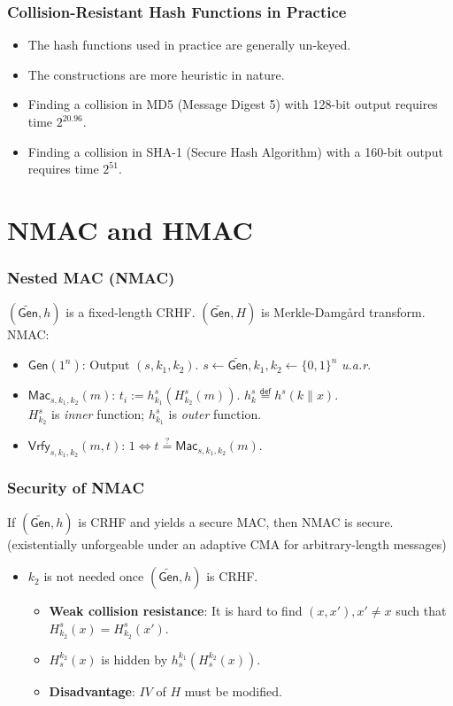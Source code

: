 \begin{frame}\frametitle{Collision-Resistant Hash Functions in Practice}
\begin{itemize}
\item The hash functions used in practice are generally un-keyed.
\item The constructions are more heuristic in nature. 
\item Finding a collision in MD5 (Message Digest 5) with 128-bit output requires time $2^{20.96}$. 
\item Finding a collision in SHA-1 (Secure Hash Algorithm) with a 160-bit output requires time $2^{51}$.
\end{itemize}
\end{frame}
\section{NMAC and HMAC}
\begin{frame}\frametitle{Nested MAC (NMAC)}
\begin{figure}
\begin{center}

\end{center}
\end{figure}
\begin{construction}
$(\widetilde{\mathsf{Gen}}, h)$ is a fixed-length CRHF. $(\widetilde{\mathsf{Gen}}, H)$ is Merkle-Damg\r{a}rd transform. NMAC:
\begin{itemize}
\item $\mathsf{Gen}(1^n)$: Output $(s, k_1, k_2)$. $s \gets \widetilde{\mathsf{Gen}}, k_1,k_2 \gets \{0,1\}^n$ \emph{u.a.r}.
\item $\mathsf{Mac}_{s,k_1,k_2}(m)$: $t_i := h_{k_1}^s(H_{k_2}^s(m))$. $h_{k}^s \overset{\mathsf{def}}{=} h^s(k\|x)$.\\
$H^s_{k_2}$ is \emph{inner} function; $h^s_{k_1}$ is \emph{outer} function.
\item $\mathsf{Vrfy}_{s,k_1,k_2}(m,t)$: $1 \iff t \overset{?}{=} \mathsf{Mac}_{s,k_1,k_2}(m)$.
\end{itemize}
\end{construction}
\end{frame}
\begin{frame}\frametitle{Security of NMAC}
\begin{theorem}
If $(\widetilde{\mathsf{Gen}}, h)$ is CRHF and yields a secure MAC, then NMAC is secure. (existentially unforgeable under an adaptive CMA for arbitrary-length messages)
\end{theorem}
\begin{itemize}
\item $k_2$ is not needed once $(\widetilde{\mathsf{Gen}}, h)$ is CRHF.
\begin{itemize}
\item \textbf{Weak collision resistance}: It is hard to find $(x, x'), x' \ne x$ such that $H^s_{k_2}(x) = H^s_{k_2}(x')$.
\item $H_s^{k_2}(x)$ is hidden by $h_s^{k_1}(H_s^{k_2}(x))$.
\item \textbf{Disadvantage}: $IV$ of $H$ must be modified.
\end{itemize}
\end{itemize}
\end{frame}
